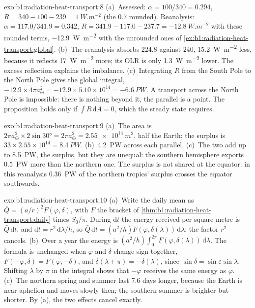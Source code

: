 \begin{solution}{exo:b1:radiation-heat-transport:8}
(a)~Assessed: $\alpha = 100/340 = 0.294$, $R = 340 - 100 - 239 =
\qty{+1}{W.m^{-2}}$ (the \num{0.7} rounded). Reanalysis: $\alpha = 117.0/341.9 =
0.342$, $R = 341.9 - 117.0 - 237.7 = \qty{-12.8}{W.m^{-2}}$ with these rounded
terms, \qty{-12.9}{W.m^{-2}} with the unrounded ones of
\cref{ex:b1:radiation-heat-transport:global}. (b)~The reanalysis
absorbs $224.8$ against $240$, \qty{15.2}{W.m^{-2}} less, because it reflects
\qty{17}{W.m^{-2}} more; its OLR is only \qty{1.3}{W.m^{-2}} lower. The excess
reflection explains the imbalance. (c)~Integrating $R$ from the South Pole to the
North Pole gives the global integral, $-12.9 \times 4\pi a_\oplus^2 = -12.9 \times
5.10\times10^{14} = \qty{-6.6}{PW}$. A transport across the North Pole is
impossible: there is nothing beyond it, the parallel is a point. The proposition
holds only if $\int R\,\mathrm dA = 0$, which the steady state requires.
\end{solution}

\begin{solution}{exo:b1:radiation-heat-transport:9}
(a)~The area is $2\pi a_\oplus^2 \times 2\sin\ang{30} = 2\pi a_\oplus^2 =
\qty{2.55e14}{m^2}$, half the Earth; the surplus is $33 \times 2.55\times10^{14} =
\qty{8.4}{PW}$. (b)~\qty{4.2}{PW} across each parallel. (c)~The two add up to
\qty{8.5}{PW}, the surplus, but they are unequal: the southern hemisphere exports
\qty{0.5}{PW} more than the northern one. The surplus is not shared at the
equator: in this reanalysis \qty{0.36}{PW} of the northern tropics' surplus crosses
the equator southwards.
\end{solution}

\begin{solution}{exo:b1:radiation-heat-transport:10}
(a)~Write the daily mean as $\bar Q = (a/r)^2 F(\varphi, \delta)$, with $F$ the
bracket of \cref{thm:b1:radiation-heat-transport:daily} times $S_0/\pi$. During
$\mathrm dt$ the energy received per square metre is $\bar Q\,\mathrm dt$, and
$\mathrm dt = r^2\,\mathrm d\lambda/h$, so $\bar Q\,\mathrm dt = (a^2/h)
F(\varphi, \delta(\lambda))\,\mathrm d\lambda$: the factor $r^2$ cancels.
(b)~Over a year the energy is $(a^2/h)\int_0^{2\pi} F(\varphi,
\delta(\lambda))\,\mathrm d\lambda$. The formula is unchanged when $\varphi$ and
$\delta$ change sign together, $F(-\varphi, \delta) = F(\varphi, -\delta)$, and
$\delta(\lambda + \pi) = -\delta(\lambda)$, since $\sin\delta = \sin\varepsilon
\sin\lambda$. Shifting $\lambda$ by $\pi$ in the integral shows that $-\varphi$
receives the same energy as $\varphi$. (c)~The northern spring and summer last
\num{7.6} days longer, because the Earth is near aphelion and moves slowly then; the
southern summer is brighter but shorter. By (a), the two effects cancel exactly.
\end{solution}

